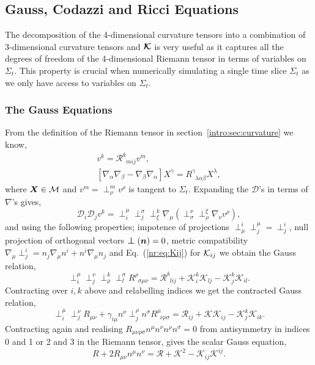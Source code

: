 \subsection{Gauss, Codazzi and Ricci Equations}\label{nr:sec:gausscodazzi}
The decomposition of the 4-dimensional curvature tensors into a combination of 3-dimensional curvature tensors and $\boldsymbol{\mathcal{K}}$ is very useful as it captures all the degrees of freedom of the 4-dimensional Riemann tensor in terms of variables on $\Sigma_t$. This property is crucial when numerically simulating a single time slice $\Sigma_t$ as we only have access to variables on $\Sigma_t$.

\subsubsection{The Gauss Equations}
From the definition of the Riemann tensor in section~\ref{intro:sec:curvature} we know,
\begin{align} 
[\mathcal{D}_ i \mathcal{D}_ j -\mathcal{D}_ j \mathcal{D}_ i ]v^ k  = \mathcal{R}^ k _{\,\,\, m  i  j }v^ m  , \\
 [\nabla_\alpha\nabla_\beta-\nabla_\beta\nabla_\alpha]X^\gamma = {R}^\gamma_{\,\,\,\lambda \alpha\beta}X^\lambda  , 
 \end{align}
where $\boldsymbol{X}\in \mathcal{M}$ and $v^ m = \perp^ m  _\rho v^\rho$ is tangent to $\Sigma_t$. Expanding the $\mathcal{D}$'s in terms of $\nabla$'s gives,
\begin{equation} \mathcal{D}_ i  \mathcal{D}_ j  v^ k  = \perp^\mu_ i  \perp_ j ^\sigma \perp^ k _\xi \nabla_\mu(\perp^\nu_\sigma \perp^\xi_\rho \nabla_\nu v^\rho),\end{equation}
and using the following properties; impotence of projections $\perp^ i _\mu \perp^\mu_ j  = \perp^ i _ j $, null projection of orthogonal vectors $\boldsymbol{\perp} (\boldsymbol{n}) =0$, metric compatibility $\nabla_\mu \perp^ i _ j  = n_ j \nabla_\mu n^ i  + n^ i  \nabla_\mu n_ j $ and Eq.~(\ref{nr:eq:Kij}) for $\mathcal{K}_{ij}$ we obtain the Gauss relation,
\begin{equation} \perp^\mu_ i  \perp^\nu_ j  \perp^ k _\rho \perp^\sigma_ l R^{\rho}_{\,\,\,\sigma\mu\nu} = \mathcal{R}^ k _{\,\,\, l i  j } + \mathcal{K}^ k _ i  \mathcal{K}_{ l j } - \mathcal{K}^ k _ j  \mathcal{K}_{ i l} . \end{equation}
Contracting over $ i , k $ above and relabelling indices we get the contracted Gauss relation,
\begin{equation} \perp^\mu_ i  \perp^\nu_ j  R_{\mu\nu} +  \gamma _{ i \mu}n^\nu\perp^\rho_ j  n^\sigma R^\mu_{\,\,\,\nu\rho\sigma} = \mathcal{R}_{ i  j } + \mathcal{K} \mathcal{K}_{ i  j } - \mathcal{K}^k_ j  \mathcal{K}_{ i k}.  \end{equation}
Contracting again and realising $R_{\mu\nu\rho\sigma}n^\mu n^\nu n^\rho n^\sigma=0$ from antisymmetry in indices 0 and 1 or 2 and 3 in the Riemann tensor, gives the scalar Gauss equation,
\begin{equation}R + 2R_{\mu\nu}n^\mu n^\nu = \mathcal{R} + \mathcal{K}^2 - \mathcal{K}_{ij}\mathcal{K}^{ij}.\end{equation}


